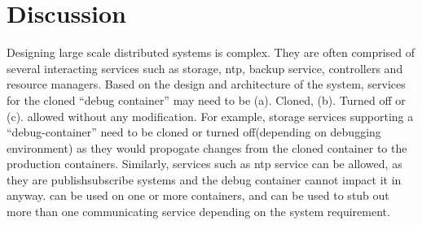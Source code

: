 \section{Discussion}
\label{sec:discussion}

Designing large scale distributed systems is complex. They are often comprised of several interacting services such as storage, ntp, backup service, controllers and resource managers.
Based on the design and architecture of the system, services for the cloned ``debug container'' may need to be (a). Cloned, (b). Turned off or (c). allowed without any modification.
For example, storage services supporting a ``debug-container'' need to be cloned or turned off(depending on debugging environment) as they would propogate changes from the cloned container to the production containers.
Similarly, services such as ntp service can be allowed, as they are publish\/subscribe systems and the debug container cannot impact it in anyway.
\parikshan can be used on one or more containers, and can be used to stub out more than one communicating service depending on the system requirement.





